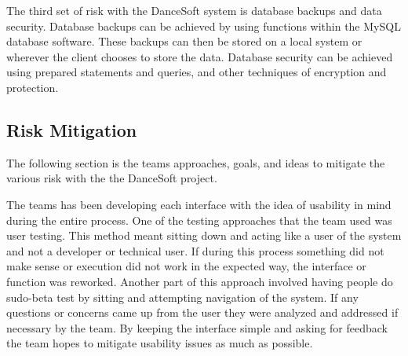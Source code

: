 The third set of risk with the DanceSoft system is database backups and data security. Database backups can be achieved by using functions within the MySQL database software. These backups can then be stored on a local system or wherever the client chooses to store the data. Database security can be achieved using prepared statements and queries, and other techniques of encryption and protection.  


\subsection{Risk Mitigation}
The following section is the teams approaches, goals, and ideas to mitigate the various risk with the the DanceSoft project.

The teams has been developing each interface with the idea of usability in mind during the entire process. One of the testing approaches that the team used was user testing. This method meant sitting down and acting like a user of the system and not a developer or technical user. If during this process something did not make sense or execution did not work in the expected way, the interface or function was reworked. Another part of this approach involved having people do sudo-beta test by sitting and attempting navigation of the system. If any questions or concerns came up from the user they were analyzed and addressed if necessary by the team. By keeping the interface simple and asking for feedback the team hopes to mitigate usability issues as much as possible.

